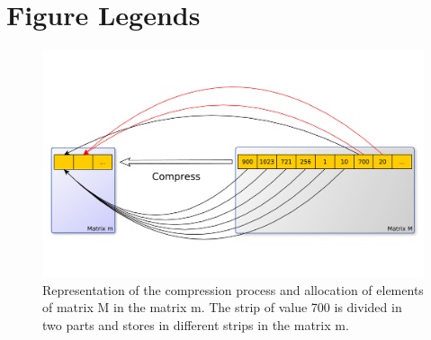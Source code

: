 \documentclass[10pt]{article}
\begin{document}
\section*{Figure Legends}

\begin{figure}[h]
  \includegraphics[scale=0.3,clip]{fig01}
  \caption{Representation of the compression process and allocation of 
elements of matrix M in the matrix m. The strip of value 700 is divided in two 
parts and stores in different strips in the matrix m.}
  \label{fig:01}
\end{figure}
\end{document}
